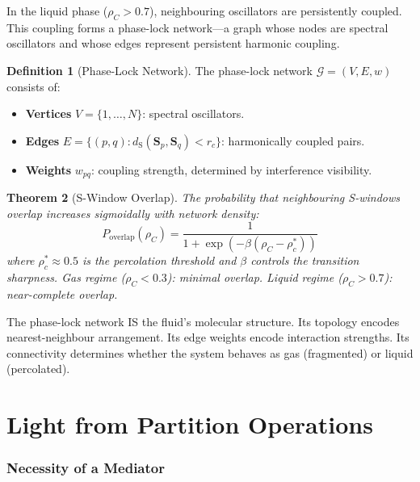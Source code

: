 \documentclass[twocolumn,10pt,a4paper]{article}
\theoremstyle{plain}
\newtheorem{theorem}{Theorem}[section]
\theoremstyle{definition}
\newtheorem{definition}[theorem]{Definition}
\theoremstyle{remark}
\newcommand{\Scoord}{\mathbf{S}}
\newcommand{\dS}{d_{\mathrm{S}}}
\begin{document}
In the liquid phase ($\rho_C > 0.7$), neighbouring oscillators are persistently coupled. This coupling forms a phase-lock network---a graph whose nodes are spectral oscillators and whose edges represent persistent harmonic coupling.

\begin{definition}[Phase-Lock Network]
\label{def:phase_lock}
The phase-lock network $\mathcal{G} = (V, E, w)$ consists of:
\begin{itemize}
    \item \textbf{Vertices} $V = \{1, \ldots, N\}$: spectral oscillators.
    \item \textbf{Edges} $E = \{(p,q) : \dS(\Scoord_p, \Scoord_q) < r_c\}$: harmonically coupled pairs.
    \item \textbf{Weights} $w_{pq}$: coupling strength, determined by interference visibility.
\end{itemize}
\end{definition}

\begin{theorem}[S-Window Overlap]
\label{thm:overlap}
The probability that neighbouring S-windows overlap increases sigmoidally with network density:
\begin{equation}
    P_{\mathrm{overlap}}(\rho_C) = \frac{1}{1 + \exp(-\beta(\rho_C - \rho_c^*))}
\end{equation}
where $\rho_c^* \approx 0.5$ is the percolation threshold and $\beta$ controls the transition sharpness. Gas regime ($\rho_C < 0.3$): minimal overlap. Liquid regime ($\rho_C > 0.7$): near-complete overlap.
\end{theorem}

The phase-lock network IS the fluid's molecular structure. Its topology encodes nearest-neighbour arrangement. Its edge weights encode interaction strengths. Its connectivity determines whether the system behaves as gas (fragmented) or liquid (percolated).


\part{Light from Partition Operations}
\label{part:light}

\section{Necessity of a Mediator}
\label{sec:mediator}
\end{document}
